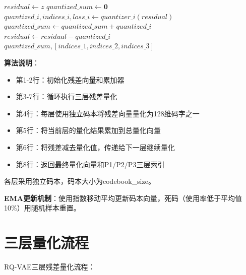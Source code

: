 \begin{algorithm}[htbp]
\caption{残差量化算法}
\label{alg:rq}
\begin{algorithmic}[1]
\State $residual \gets z$ 
\State $quantized\_sum \gets \mathbf{0}$ 
    \State $quantized\_i, indices\_i, loss\_i \gets quantizer\_i(residual)$ 
    \State $quantized\_sum \gets quantized\_sum + quantized\_i$ 
    \State $residual \gets residual - quantized\_i$ 
\EndFor
\State \Return $quantized\_sum, [indices\_1, indices\_2, indices\_3]$ 
\end{algorithmic}
\end{algorithm}

\textbf{算法说明}：
\begin{itemize}
    \item 第1-2行：初始化残差向量和累加器
    \item 第3-7行：循环执行三层残差量化
    \item 第4行：每层使用独立码本将残差向量量化为128维码字之一
    \item 第5行：将当前层的量化结果累加到总量化向量
    \item 第6行：将残差减去量化值，传递给下一层继续量化
    \item 第8行：返回最终量化向量和P1/P2/P3三层索引
\end{itemize}

各层采用独立码本，码本大小为codebook\_size。

\textbf{EMA更新机制}：使用指数移动平均更新码本向量，死码（使用率低于平均值10\%）用随机样本重置。

\section{三层量化流程}
\label{sec:rq三层_quant}

RQ-VAE三层残差量化流程：

